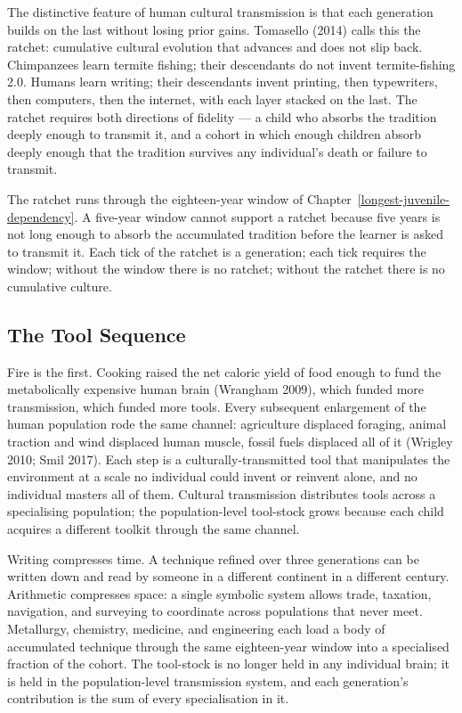 \documentclass[12pt,letterpaper]{article}
\begin{document}
The distinctive feature of human cultural transmission is that each
generation builds on the last without losing prior gains. Tomasello
(2014) calls this the ratchet: cumulative cultural evolution that
advances and does not slip back. Chimpanzees learn termite fishing;
their descendants do not invent termite-fishing 2.0. Humans learn
writing; their descendants invent printing, then typewriters, then
computers, then the internet, with each layer stacked on the last.
The ratchet requires both directions of fidelity --- a child who
absorbs the tradition deeply enough to transmit it, and a cohort in
which enough children absorb deeply enough that the tradition
survives any individual's death or failure to transmit.

The ratchet runs through the eighteen-year window of
Chapter~\ref{longest-juvenile-dependency}. A five-year window cannot
support a ratchet because five years is not long enough to absorb
the accumulated tradition before the learner is asked to transmit it.
Each tick of the ratchet is a generation; each tick requires the
window; without the window there is no ratchet; without the ratchet
there is no cumulative culture.

\subsection{The Tool Sequence}\label{the-tool-sequence}

Fire is the first. Cooking raised the net caloric yield of food
enough to fund the metabolically expensive human brain (Wrangham
2009), which funded more transmission, which funded more tools. Every
subsequent enlargement of the human population rode the same channel:
agriculture displaced foraging, animal traction and wind displaced
human muscle, fossil fuels displaced all of it (Wrigley 2010; Smil
2017). Each step is a culturally-transmitted tool that manipulates
the environment at a scale no individual could invent or reinvent
alone, and no individual masters all of them. Cultural transmission
distributes tools across a specialising population; the
population-level tool-stock grows because each child acquires a
different toolkit through the same channel.

Writing compresses time. A technique refined over three generations
can be written down and read by someone in a different continent in a
different century. Arithmetic compresses space: a single symbolic
system allows trade, taxation, navigation, and surveying to
coordinate across populations that never meet. Metallurgy, chemistry,
medicine, and engineering each load a body of accumulated technique
through the same eighteen-year window into a specialised fraction of
the cohort. The tool-stock is no longer held in any individual brain;
it is held in the population-level transmission system, and each
generation's contribution is the sum of every specialisation in it.
\end{document}
